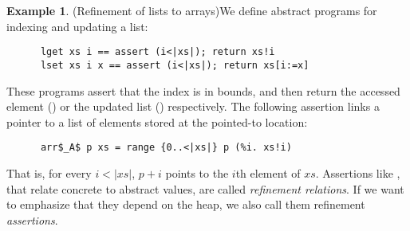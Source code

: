 \documentclass[sn-mathphys,Numbered]{sn-jnl}
\theoremstyle{thmstyleone}%
\theoremstyle{definition}%
\newtheorem{example}{Example}%
\theoremstyle{thmstylethree}%
\begin{document}
  \begin{example}(Refinement of lists to arrays)\label{ex:ref_array}
    We define abstract programs for indexing and updating a list:
    \begin{lstlisting}
      lget xs i == assert (i<|xs|); return xs!i
      lset xs i x == assert (i<|xs|); return xs[i:=x]
    \end{lstlisting}
    These programs assert that the index is in bounds, and then return the accessed element ()
    or the updated list () respectively. The following assertion links a pointer to a list of
    elements stored at the pointed-to location:
    \begin{lstlisting}
      arr$_A$ p xs = range {0..<|xs|} p (%i. xs!i)
    \end{lstlisting}
    That is, for every $i<|xs|$, $p+i$ points to the $i$th element of $xs$.
    Assertions like , that relate concrete to abstract values, are called \emph{refinement relations}.
    If we want to emphasize that they depend on the heap, we also call them refinement \emph{assertions}.


\end{example}
\end{document}
